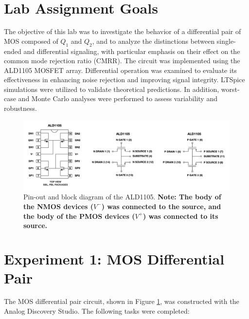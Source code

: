 


\section{Lab Assignment Goals}
\vspace{.25cm}
\justifying
\par The objective of this lab was to investigate the behavior of a differential pair of MOS composed of $Q_1$ and $Q_2$, and to analyze the distinctions between single-ended and differential signaling, with particular emphasis on their effect on the common mode rejection ratio (CMRR). The circuit was implemented using the ALD1105 MOSFET array. Differential operation was examined to evaluate its effectiveness in enhancing noise rejection and improving signal integrity. LTSpice simulations were utilized to validate theoretical predictions. In addition, worst-case and Monte Carlo analyses were performed to assess variability and robustness.

\begin{center}
\begin{figure}[H]
\includegraphics[scale=0.5]{Chapter_6/Lab_06_Image_1.png}
\caption{Pin-out and block diagram of the ALD1105. \textbf{Note: The body of the NMOS devices ($V^{-}$) was connected to the source, and the body of the PMOS devices ($V^{+}$) was connected to its source.}}
\label{Ch6_fig:1}
\end{figure}
\end{center}

\section{Experiment 1: MOS Differential Pair}

The MOS differential pair circuit, shown in Figure \ref{Ch6_fig:1}, was constructed with the Analog Discovery Studio. The following tasks were completed:

